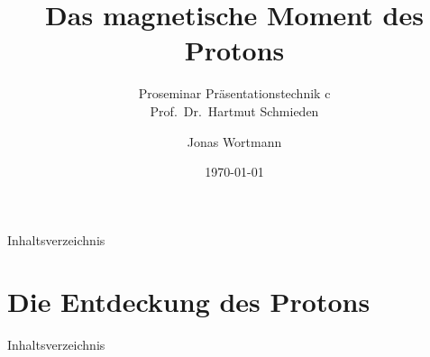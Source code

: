 \documentclass[t,9pt]{beamer}
\title[\thesection]{Das magnetische Moment des Protons}
\subtitle{Proseminar Präsentationstechnik c \\\tiny Prof.\ Dr.\ Hartmut Schmieden}
\author{Jonas Wortmann}
\institute{Universität Bonn}
\date{\today}
\begin{document}

        \begin{frame}
                \titlepage
        \end{frame}

        \begin{frame}{Inhaltsverzeichnis}
                \tableofcontents[pausesections]
        \end{frame}

        \section{Die Entdeckung des Protons}

        \begin{frame}{Inhaltsverzeichnis}
                \tableofcontents[currentsection]
        \end{frame}
\end{document}
